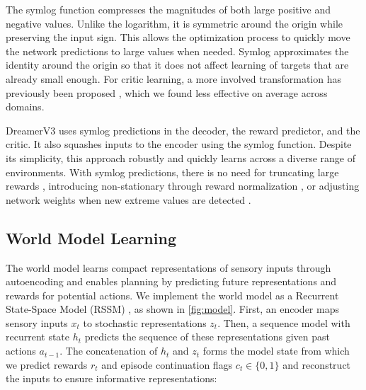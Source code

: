 
%
The symlog function compresses the magnitudes of both large positive and negative values.
Unlike the logarithm, it is symmetric around the origin while preserving the input sign.
This allows the optimization process to quickly move the network predictions to large values when needed.
Symlog approximates the identity around the origin so that it does not affect learning of targets that are already small enough.
For critic learning, a more involved transformation has previously been proposed \citep{kapturowski2018r2d2}, which we found less effective on average across domains.

DreamerV3 uses symlog predictions in the decoder, the reward predictor, and the critic. It
also squashes inputs to the encoder using the symlog function.
Despite its simplicity, this approach robustly and quickly learns across a diverse range of environments.
With symlog predictions, there is no need for truncating large rewards \citep{mnih2015dqn}, introducing non-stationary through reward normalization \citep{schulman2017ppo}, or adjusting network weights when new extreme values are detected \citep{hessel2019popart}.

\subsection*{World Model Learning}

The world model learns compact representations of sensory inputs through autoencoding \citep{hinton2006ae,kingma2013vae} and enables planning by predicting future representations and rewards for potential actions.
We implement the world model as a Recurrent State-Space Model (RSSM) \citep{hafner2018planet}, as shown in \cref{fig:model}.
First, an encoder maps sensory inputs $x_t$ to stochastic representations $z_t$.
Then, a sequence model with recurrent state $h_t$ predicts the sequence of these representations given past actions $a_{t-1}$.
The concatenation of $h_t$ and $z_t$ forms the model state from which we predict rewards $r_t$ and episode continuation flags $c_t\in\{0,1\}$ and reconstruct the inputs to ensure informative representations:

